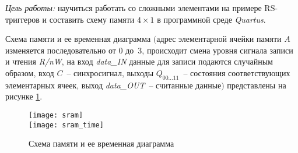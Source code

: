 


    
    \emph{Цель работы:} научиться работать со сложными элементами на примере
    RS-триггеров и составить схему памяти \( 4\times1 \) в программной среде
    \emph{Quartus}.

    \vspace*{2em}

    Схема памяти и ее временная диаграмма \(\bigl(\)адрес элементарной ячейки
    памяти \( A \) изменяется последовательно от 0 до~3, происходит смена
    уровня сигнала записи и чтения \emph{R/nW}, на вход \emph{data\_IN} данные
    для записи подаются случайным образом, вход \( C \)~-- синхросигнал, выходы
    \( Q_{00\ldots11} \)~-- состояния соответствующих элементарных ячеек, выход
    \emph{data\_OUT}~-- считанные данные\(\bigr)\) представлены на рисунке
    \ref{pic_memory}.
    
    \begin{figure}[h!]
        \center
        \texttt{[image: sram]} \vspace*{2em}\\
        \texttt{[image: sram\_time]}
        \caption{Схема памяти и ее временная диаграмма}
        \label{pic_memory}
    \end{figure}    

